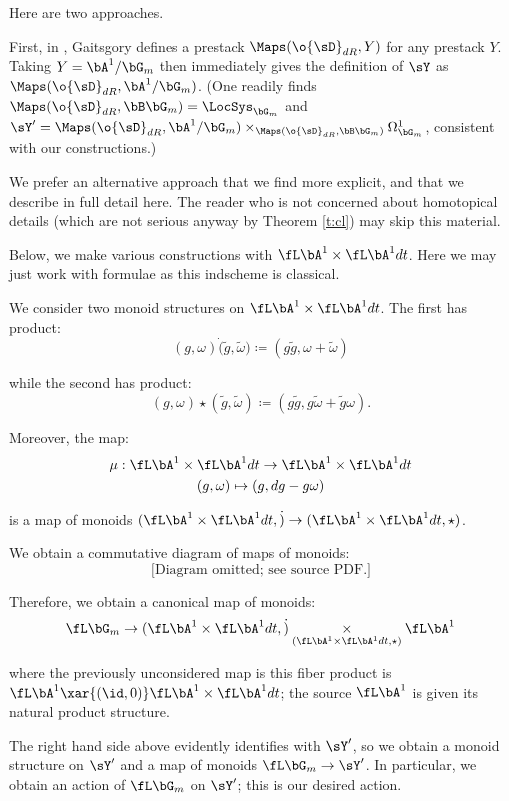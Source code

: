 Here are two approaches.

First, in \cite{dennis-punctured-disc},
Gaitsgory defines a prestack $\Maps(\o{\sD}_{dR},Y)$ for any
prestack $Y$. Taking $Y = \bA^1/\bG_m$ then immediately gives the definition
of $\sY$ as $\Maps(\o{\sD}_{dR},\bA^1/\bG_m)$. (One readily
finds $\Maps(\o{\sD}_{dR},\bB \bG_m) = \LocSys_{\bG_m}$ and
$\sY^{\prime} = \Maps(\o{\sD}_{dR},\bA^1/\bG_m)
\times_{\Maps(\o{\sD}_{dR},\bB \bG_m)} \Omega_{\bG_m}^1$, consistent
with our constructions.)

We prefer an alternative approach that we find more explicit, and that we
describe in full detail here. The reader who is not concerned about
homotopical details (which are not serious anyway by Theorem \ref{t:cl})
may skip this material.

Below, we make various constructions with $\fL \bA^1 \times \fL \bA^1 dt$. Here we may
just work with formulae as this indscheme is classical.

We consider two monoid structures on $\fL \bA^1 \times \fL \bA^1 dt$.
The first has product:
%
\[
(g,\omega) \dot (\tilde{g},\tilde{\omega}) \coloneqq
(g\tilde{g},\omega+\tilde{\omega})
\]

 while the second has product:
%
\[
(g,\omega) \star (\tilde{g},\tilde{\omega}) \coloneqq
(g\tilde{g},g\tilde{\omega}+\tilde{g}\omega).
\]

 Moreover, the map:
%
\[
\begin{gathered}
\mu:\fL \bA^1 \times \fL \bA^1 dt \to \fL \bA^1 \times \fL \bA^1 dt \\
(g,\omega) \mapsto (g,dg-g\omega)
\end{gathered}
\]

 is a map of monoids $(\fL \bA^1 \times \fL \bA^1 dt,\dot) \to
(\fL \bA^1 \times \fL \bA^1 dt,\star)$.

We obtain a commutative diagram of maps of monoids:
%
\[
\text{[Diagram omitted; see source PDF.]}
\]

Therefore, we obtain a canonical map of monoids:
%
\[
\fL \bG_m \to (\fL \bA^1 \times \fL \bA^1 dt,\dot)
\underset{(\fL \bA^1 \times \fL \bA^1 dt,\star)}{\times}
\fL \bA^1
\]

 where the previously unconsidered map is this
fiber product is $\fL \bA^1 \xar{(\id,0)} \fL \bA^1 \times \fL \bA^1 dt$; the source $\fL \bA^1$ is given its natural
product structure.

The right hand side above evidently
identifies with $\sY^{\prime}$, so we obtain a monoid
structure on $\sY^{\prime}$ and a map of monoids
$\fL \bG_m \to \sY^{\prime}$. In particular, we obtain
an action of $\fL \bG_m$ on $\sY^{\prime}$; this is
our desired action.

